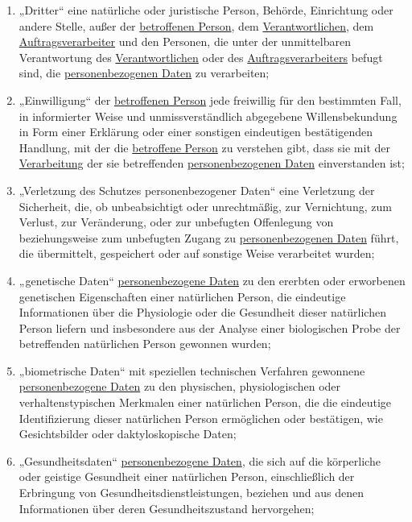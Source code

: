 \begin{enumerate}
  \item „Dritter“ eine natürliche oder juristische Person, Behörde, Einrichtung oder andere Stelle, außer der
   \hyperref[itm:04-1]{betroffenen Person}, dem \hyperref[itm:04-7]{Verantwortlichen}, dem \hyperref[itm:04-8]{Auftragsverarbeiter} und den Personen, die unter der unmittelbaren
   Verantwortung des \hyperref[itm:04-7]{Verantwortlichen} oder des \hyperref[itm:04-8]{Auftragsverarbeiters} befugt sind, die \hyperref[itm:04-1]{personenbezogenen Daten} zu
   verarbeiten;
  \label{itm:04-10}

  \item „Einwilligung“ der \hyperref[itm:04-1]{betroffenen Person} jede freiwillig für den bestimmten Fall, in informierter Weise und
   unmissverständlich abgegebene Willensbekundung in Form einer Erklärung oder einer sonstigen eindeutigen
   bestätigenden Handlung, mit der die \hyperref[itm:04-1]{betroffene Person} zu verstehen gibt, dass sie mit der \hyperref[itm:04-2]{Verarbeitung} der sie
   betreffenden \hyperref[itm:04-1]{personenbezogenen Daten} einverstanden ist;
  \label{itm:04-11}

  \item „Verletzung des Schutzes personenbezogener Daten“ eine Verletzung der Sicherheit, die, ob unbeabsichtigt oder
   unrechtmäßig, zur Vernichtung, zum Verlust, zur Veränderung, oder zur unbefugten Offenlegung von beziehungsweise zum
   unbefugten Zugang zu \hyperref[itm:04-1]{personenbezogenen Daten} führt, die übermittelt, gespeichert oder auf sonstige Weise verarbeitet
   wurden;
  \label{itm:04-12}

  \item „genetische Daten“ \hyperref[itm:04-1]{personenbezogene Daten} zu den ererbten oder erworbenen genetischen Eigenschaften einer
   natürlichen Person, die eindeutige Informationen über die Physiologie oder die Gesundheit dieser natürlichen Person
   liefern und insbesondere aus der Analyse einer biologischen Probe der betreffenden natürlichen Person gewonnen
   wurden;
  \label{itm:04-13}

  \item „biometrische Daten“ mit speziellen technischen Verfahren gewonnene \hyperref[itm:04-1]{personenbezogene Daten} zu den physischen,
   physiologischen oder verhaltenstypischen Merkmalen einer natürlichen Person, die die eindeutige Identifizierung
   dieser natürlichen Person ermöglichen oder bestätigen, wie Gesichtsbilder oder daktyloskopische Daten;
  \label{itm:04-14}

  \item „Gesundheitsdaten“ \hyperref[itm:04-1]{personenbezogene Daten}, die sich auf die körperliche oder geistige Gesundheit einer
   natürlichen Person, einschließlich der Erbringung von Gesundheitsdienstleistungen, beziehen und aus denen
   Informationen über deren Gesundheitszustand hervorgehen;
  \label{itm:04-15}


\end{enumerate}
